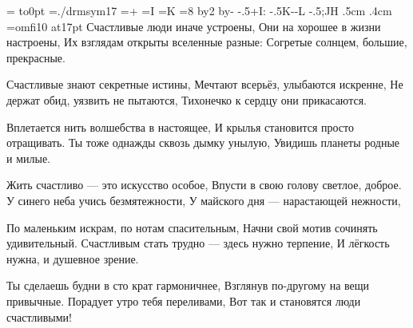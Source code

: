 \output={\shipout\vbox{
  \vbox to0pt{
        \font\dingbat=./drmsym17 \dingbat
        =\hbox{^^2b}
        =\hbox{^^49}
        =\hbox{^^4b}
        =8 \advance{} by2 \advance{} by-\hsize
        \kern-2cm
        \hbox{\kern-.5^^2b\hbox{\leaders\hbox{^^49}}^^3a}
        \nointerlineskip
        \vbox{\leaders\hbox{\kern-.5^^4b\kern-\kern-^^4c}%
          }
        \nointerlineskip
        \hbox{\kern-.5^^3b\hbox{\leaders\hbox{^^4a}}^^48}
        \vss}
  \nointerlineskip
  \kern.5cm
  \moveright.4cm }}
\font\rm=omfi10 at17pt \rm
\parindent=0pt
\def\par{\leavevmode\endgraf} \obeylines \let\par=\endgraf %
%
Счастливые люди иначе устроены,
Они на хорошее в жизни настроены,
Их взглядам открыты вселенные разные:
Согретые солнцем, большие, прекрасные.

Счастливые знают секретные истины,
Мечтают всерьёз, улыбаются искренне,
Не держат обид, уязвить не пытаются,
Тихонечко к сердцу они прикасаются.

Вплетается нить волшебства в настоящее,
И крылья становится просто отращивать.
Ты тоже однажды сквозь дымку унылую,
Увидишь планеты родные и милые.

Жить счастливо --- это искусство особое,
Впусти в свою голову светлое, доброе.
У синего неба учись безмятежности,
У майского дня --- нарастающей нежности,

По маленьким искрам, по нотам спасительным,
Начни свой мотив сочинять удивительный.
Счастливым стать трудно --- здесь нужно терпение,
И лёгкость нужна, и душевное зрение.

Ты сделаешь будни в сто крат гармоничнее,
Взглянув по-другому на вещи привычные.
Порадует утро тебя переливами,
Вот так и становятся люди счастливыми!

\bye
